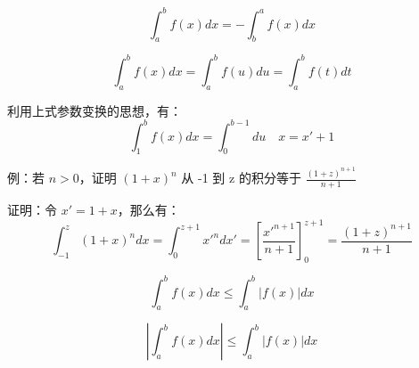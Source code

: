\documentclass[12pt]{article}
\begin{document}
$$
\int_a^bf(x)dx = -\int_b^af(x)dx
$$

$$
\int_a^bf(x)dx = \int_a^bf(u)du = \int_a^bf(t)dt
$$

\begin{framed}  
利用上式参数变换的思想，有：
$$
\int_1^bf(x)dx = \int_0^{b-1}du \quad x = x' + 1    
$$

例：若 $n > 0$，证明 $(1+x)^n$ 从 -1 到 z 的积分等于 $\frac{(1+z)^{n+1}}{n+1}$

证明：令 $x' = 1+x$，那么有：
$$
\int_{-1}^z (1+x)^ndx = \int_0^{z+1}{x'}^ndx' = [\frac{{x'}^{n+1}}{n+1}]_0^{z+1} = \frac{(1+z)^{n+1}}{n+1}
$$
\end{framed}

$$
\int_a^bf(x)dx \le \int_a^b|f(x)|dx
$$

$$
|\int_a^bf(x)dx| \le \int_a^b|f(x)|dx
$$
\end{document}
